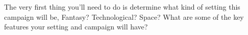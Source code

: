 
The very first thing you'll need to do is determine what kind of
setting this campaign will be, Fantasy? Technological? Space?
What are some of the key features your setting and campaign will have?
